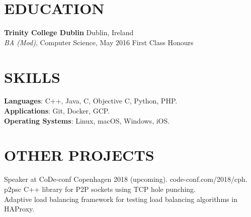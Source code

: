 \documentclass[overlapped,12pt]{res}
\begin{document}
\begin{resume}
\section{EDUCATION}
\textbf{Trinity College Dublin}\hfill
Dublin, Ireland\\
{\sl BA (Mod)}, Computer Science, May 2016\hfill 
First Class Honours

\section{SKILLS}
\textbf{Languages}: C++, Java, C, Objective C, Python, PHP.\\
\textbf{Applications}: Git, Docker, GCP.\\
\textbf{Operating Systems}: Linux, macOS, Windows, iOS.

\section{OTHER PROJECTS}
Speaker at CoDe-conf Copenhagen 2018 (upcoming). code-conf.com/2018/cph.\\
p2psc C++ library for P2P sockets using TCP hole punching.\\
Adaptive load balancing framework for testing load balancing algorithms in
HAProxy.
\end{resume}
\end{document}
